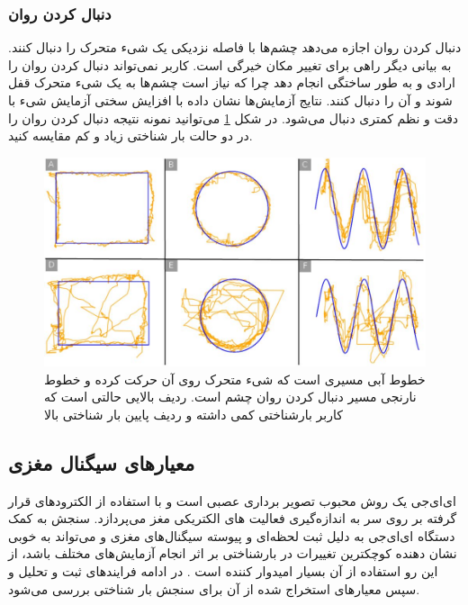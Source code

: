 \subsubsection{دنبال کردن روان}
دنبال کردن روان
اجازه می‌دهد چشم‌ها با فاصله نزدیکی یک شیء متحرک را دنبال کنند. به بیانی دیگر راهی برای تغییر مکان خیرگی است.
کاربر نمی‌تواند دنبال کردن روان را ارادی و به طور ساختگی انجام دهد چرا که نیاز است چشم‌ها به یک شیء متحرک قفل شوند و آن را دنبال کنند. نتایج آزمایش‌ها نشان داده با افزایش سختی آزمایش شیء با دقت و نظم کمتری دنبال می‌شود. در شکل 
\ref{fig:smoothpursuit}
می‌توانید نمونه نتیجه دنبال کردن روان را در دو حالت بار شناختی زیاد و کم مقایسه کنید.
\begin{figure}[htbp]
	\centering
	\includegraphics[width=0.7\linewidth]{figures/Smooth_Pursuit}
	\caption[آزمایش دنبال کردن روان یک شیء]{خطوط آبی مسیری است که شیء متحرک روی آن حرکت کرده و خطوط نارنجی مسیر دنبال کردن روان چشم است. ردیف بالایی حالتی است که کاربر بارشناختی کمی داشته و ردیف پایین بار شناختی بالا}
	\label{fig:smoothpursuit}
\end{figure}


\subsection{معیار‌های سیگنال مغزی}
ای‌ای‌جی یک روش محبوب تصویر برداری عصبی
است و با استفاده از الکترود‌های قرار گرفته بر روی سر به اندازه‌گیری فعالیت های الکتریکی مغز می‌پردازد. سنجش به کمک دستگاه ای‌ای‌جی به دلیل ثبت لحظه‌ای و پیوسته سیگنال‌های مغزی و می‌تواند به خوبی نشان دهنده کوچکترین تغییرات در بارشناختی بر اثر انجام آزمایش‌های مختلف باشد، از این رو استفاده از آن بسیار امیدوار کننده است . در ادامه فرایند‌های ثبت و تحلیل و سپس معیار‌های استخراج شده از آن برای سنجش بار شناختی بررسی می‌شود.
